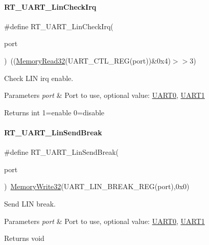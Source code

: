\paragraph{\texorpdfstring{R\+T\+\_\+\+U\+A\+R\+T\+\_\+\+Lin\+Check\+Irq}{RT\_UART\_LinCheckIrq}}
{\footnotesize\ttfamily \#define R\+T\+\_\+\+U\+A\+R\+T\+\_\+\+Lin\+Check\+Irq(\begin{DoxyParamCaption}\item[{}]{port }\end{DoxyParamCaption})~((\mbox{\hyperlink{a00020_a2d484dc15bdf30ee11ab3b05f31f0e16}{Memory\+Read32}}(U\+A\+R\+T\+\_\+\+C\+T\+L\+\_\+\+R\+EG(port))\&0x4)$>$$>$3)}



Check L\+IN irq enable. 


\begin{DoxyParams}{Parameters}
{\em port} & Port to use, optional value\+: \mbox{\hyperlink{a00056_a0508661f121639ffdee7de2353a0def2}{U\+A\+R\+T0}}, \mbox{\hyperlink{a00056_a8d69bf04d07af4fbbab5a8bd291f65ff}{U\+A\+R\+T1}} \\
\hline
\end{DoxyParams}
\begin{DoxyReturn}{Returns}
int 1=enable 0=disable 
\end{DoxyReturn}
\mbox{\label{a00056_ad1e6c13693e5ea54a55ce78635617178}} 
\paragraph{\texorpdfstring{R\+T\+\_\+\+U\+A\+R\+T\+\_\+\+Lin\+Send\+Break}{RT\_UART\_LinSendBreak}}
{\footnotesize\ttfamily \#define R\+T\+\_\+\+U\+A\+R\+T\+\_\+\+Lin\+Send\+Break(\begin{DoxyParamCaption}\item[{}]{port }\end{DoxyParamCaption})~\mbox{\hyperlink{a00020_a6b9732365b12e48ddb89fe1028b975b0}{Memory\+Write32}}(U\+A\+R\+T\+\_\+\+L\+I\+N\+\_\+\+B\+R\+E\+A\+K\+\_\+\+R\+EG(port),0x0)}



Send L\+IN break. 


\begin{DoxyParams}{Parameters}
{\em port} & Port to use, optional value\+: \mbox{\hyperlink{a00056_a0508661f121639ffdee7de2353a0def2}{U\+A\+R\+T0}}, \mbox{\hyperlink{a00056_a8d69bf04d07af4fbbab5a8bd291f65ff}{U\+A\+R\+T1}} \\
\hline
\end{DoxyParams}
\begin{DoxyReturn}{Returns}
void 
\end{DoxyReturn}
\mbox{\label{a00056_a3f9518fa74ec401803fe1d15e0d39ff2}} 
